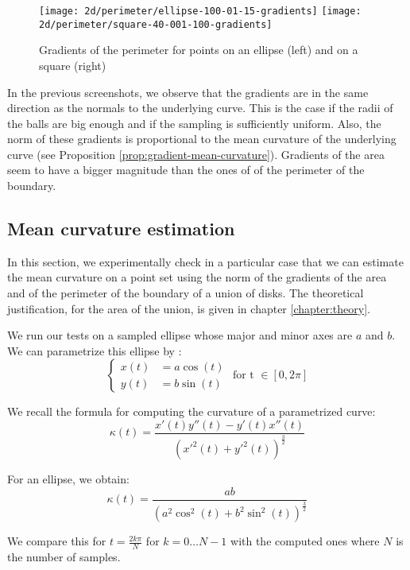 \begin{figure}[h]
    \centering
    \texttt{[image: 2d/perimeter/ellipse-100-01-15-gradients]}
    \texttt{[image: 2d/perimeter/square-40-001-100-gradients]}

    \caption{Gradients of the perimeter for points on an ellipse (left) and on a
        square (right)}
    \label{fig:gradients_perimeter_2d}
\end{figure}

In the previous screenshots, we observe that the gradients are in the same
direction as the normals to the underlying curve. This is the case if the radii
of the balls are big enough and if the sampling is sufficiently uniform. Also,
the norm of these gradients is proportional to the mean curvature of the
underlying curve (see Proposition \ref{prop:gradient-mean-curvature}).
Gradients of the area seem to have a bigger magnitude than the ones of of the
perimeter of the boundary.

\subsection{Mean curvature estimation}

In this section, we experimentally check in a particular case that we can
estimate the mean curvature on a point set using the norm of the gradients of
the area and of the perimeter of the boundary of a union of disks. The
theoretical justification, for the area of the union, is given in chapter
\ref{chapter:theory}.

We run our tests on a sampled ellipse whose major and minor axes are $ a $ and $
b $. We can parametrize this ellipse by :
$$
\begin{cases}
    x(t) &= a \cos (t) \\
    y(t) &= b \sin (t)
\end{cases}
\text{ for t } \in [ 0, 2\pi ]
$$

We recall the formula for computing the curvature of a parametrized curve:
\begin{equation}
    \kappa(t) = \frac{x'(t) y''(t) - y'(t) x''(t)}{(x'^2(t) +
        y'^2(t))^{\frac{3}{2}} }
\end{equation}

For an ellipse, we obtain:
$$ \kappa(t) = \frac{ab}{(a^2 \cos^2(t) + b^2 \sin^2(t))^{\frac{3}{2}} } $$

We compare this for $ t = \frac{2 k \pi}{N} $ for $ k = 0 \ldots N - 1 $ with
the computed ones where $ N $ is the number of samples.

